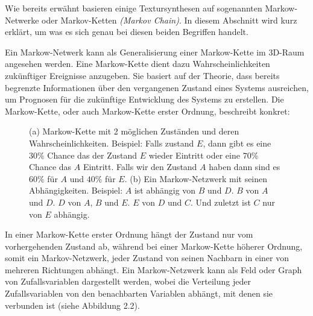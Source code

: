 \documentclass[12pt, a4paper,twoside,openright]{report} %
\begin{document}
Wie bereits erwähnt basieren einige Textursynthesen auf sogenannten Markow-Netwerke oder Markov-Ketten \textit{(Markov Chain)}.
In diesem Abschnitt wird kurz erklärt, um was es sich genau bei diesen beiden Begriffen handelt.\par
Ein Markow-Netwerk kann als Generalisierung einer Markow-Kette im 3D-Raum angesehen werden.
Eine Markow-Kette dient dazu Wahrscheinlichkeiten zukünftiger Ereignisse anzugeben.
Sie basiert auf der Theorie, dass bereits begrenzte Informationen über den vergangenen Zustand eines Systems ausreichen,
um Prognosen für die zukünftige Entwicklung des Systems zu erstellen.
Die Markow-Kette, oder auch Markow-Kette erster Ordnung, beschreibt konkret:
 \cite{wiki:Markow-Kette}

\begin{figure}[H]
    \centering
    \qquad
    \caption{(a) Markow-Kette mit 2 möglichen Zuständen und deren Wahrscheinlichkeiten. \cite{wiki:Markow-Kette}
    Beispiel: Falls zustand $E$, dann gibt es eine $30\%$ Chance das der Zustand $E$ wieder Eintritt oder eine $70\%$ Chance das $A$ Eintritt.
    Falls wir den Zustand $A$ haben dann sind es $60\%$ für $A$ und $40\%$ für $E$. (b) Ein Markow-Netzwerk mit seinen Abhängigkeiten. \cite{wiki:Markov_model}
    Beispiel: $A$ ist abhängig von $B$ und $D$. $B$ von $A$ und $D$. $D$ von $A$, $B$ und $E$. $E$ von $D$ und $C$. Und zuletzt ist $C$ nur von $E$ abhängig.}%
\end{figure}

In einer Markow-Kette erster Ordnung hängt der Zustand nur vom vorhergehenden Zustand ab,
während bei einer Markow-Kette höherer Ordnung, somit ein Markov-Netzwerk, jeder Zustand von seinen Nachbarn in einer von mehreren Richtungen abhängt. \cite{wiki:Markov_model}
Ein Markow-Netzwerk kann als Feld oder Graph von Zufallsvariablen dargestellt werden,
wobei die Verteilung jeder Zufallsvariablen von den benachbarten Variablen abhängt, mit denen sie verbunden ist {(siehe Abbildung 2.2)}.
\end{document}

